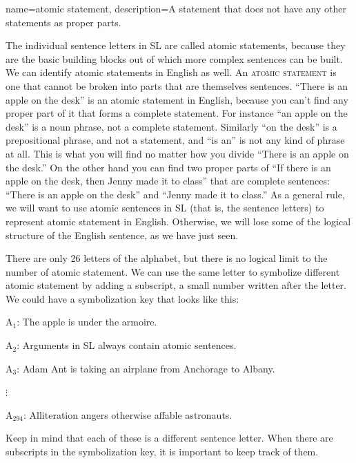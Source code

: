 {
name=atomic statement,
description={A statement that does not have any other statements as proper parts.}
}

The individual sentence letters in SL are called atomic statements, because they are the basic building blocks out of which more complex sentences can be built. We can identify atomic statements in English as well. An \textsc{\gls{atomic statement}} \label{def:atomic_statement} is one that cannot be broken into parts that are themselves sentences. ``There is an apple on the desk'' is an atomic statement in English, because you can't find any proper part of it that forms a complete statement. For instance ``an apple on the desk'' is a noun phrase, not a complete statement. Similarly ``on the desk'' is a prepositional phrase, and not a statement, and ``is an'' is not any kind of phrase at all. This is what you will find no matter how you divide ``There is an apple on the desk.'' On the other hand you can find two proper parts of ``If there is an apple on the desk, then Jenny made it to class'' that are complete sentences: ``There is an apple on the desk'' and ``Jenny made it to class.'' As a general rule, we will want to use atomic sentences in SL (that is, the sentence letters) to represent atomic statement in English. Otherwise, we will lose some of the logical structure of the English sentence, as we have just seen. 

There are only 26 letters of the alphabet, but there is no logical limit to the number of atomic statement. We can use the same letter to symbolize different atomic statement by adding a subscript, a small number written after the letter. We could have a symbolization key that looks like this:
\begin{ekey}
\item[A$_1$:] The apple is under the armoire.
\item[A$_2$:] Arguments in SL always contain atomic sentences.
\item[A$_3$:] Adam Ant is taking an airplane from Anchorage to Albany.
\item[$\vdots$]
\item[A$_{294}$:] Alliteration angers otherwise affable astronauts.
\end{ekey}
Keep in mind that each of these is a different sentence letter. When there are subscripts in the symbolization key, it is important to keep track of them.



